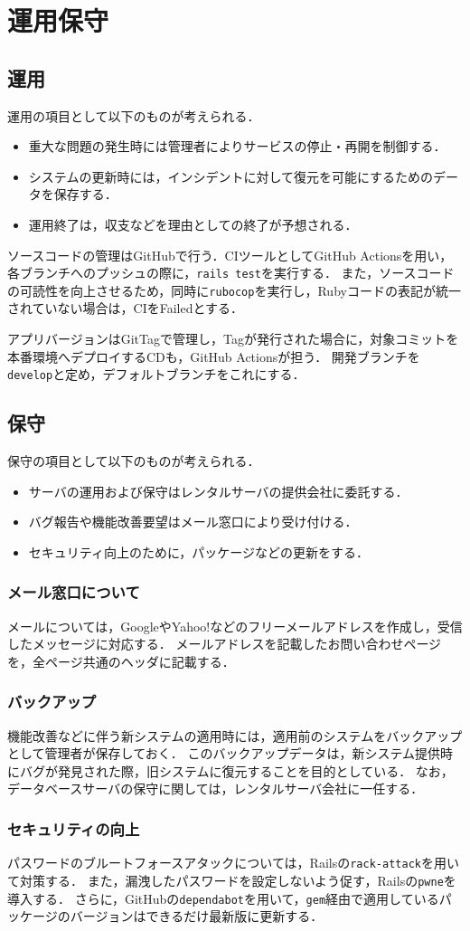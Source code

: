 \chapter{運用保守}
\section{運用}
運用の項目として以下のものが考えられる．
\begin{itemize}
    \item 重大な問題の発生時には管理者によりサービスの停止・再開を制御する．
    \item システムの更新時には，インシデントに対して復元を可能にするためのデータを保存する．
    \item 運用終了は，収支などを理由としての終了が予想される．
\end{itemize}
ソースコードの管理はGitHubで行う．CIツールとしてGitHub Actionsを用い，各ブランチへのプッシュの際に，\texttt{rails test}を実行する．
また，ソースコードの可読性を向上させるため，同時に\texttt{rubocop}を実行し，Rubyコードの表記が統一されていない場合は，CIをFailedとする．\par
アプリバージョンはGitTagで管理し，Tagが発行された場合に，対象コミットを本番環境へデプロイするCDも，GitHub Actionsが担う．
開発ブランチを\texttt{develop}と定め，デフォルトブランチをこれにする．
\section{保守}
保守の項目として以下のものが考えられる．
\begin{itemize}
    \item サーバの運用および保守はレンタルサーバの提供会社に委託する．
    \item バグ報告や機能改善要望はメール窓口により受け付ける．
    \item セキュリティ向上のために，パッケージなどの更新をする．
\end{itemize}
\subsection*{メール窓口について}
メールについては，GoogleやYahoo!などのフリーメールアドレスを作成し，受信したメッセージに対応する．
メールアドレスを記載したお問い合わせページを，全ページ共通のヘッダに記載する．
\subsection*{バックアップ}
機能改善などに伴う新システムの適用時には，適用前のシステムをバックアップとして管理者が保存しておく．
このバックアップデータは，新システム提供時にバグが発見された際，旧システムに復元することを目的としている．
なお，データベースサーバの保守に関しては，レンタルサーバ会社に一任する．
\subsection*{セキュリティの向上}
パスワードのブルートフォースアタックについては，Railsの\texttt{rack-attack}を用いて対策する．
また，漏洩したパスワードを設定しないよう促す，Railsの\texttt{pwne}を導入する．
さらに，GitHubの\texttt{dependabot}を用いて，\texttt{gem}経由で適用しているパッケージのバージョンはできるだけ最新版に更新する．